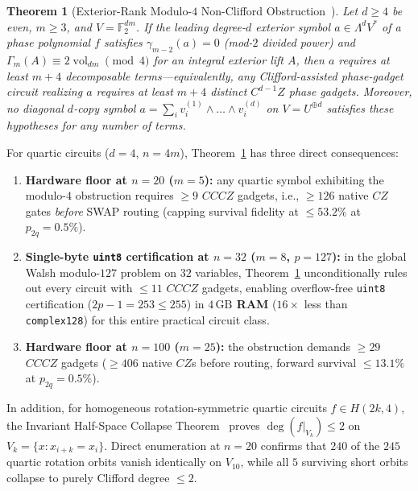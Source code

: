 \documentclass[11pt,a4paper]{article}
\newtheorem{theorem}{Theorem}
\newcommand{\F}{\mathbb{F}}
\begin{document}
\begin{theorem}[Exterior-Rank Modulo-$4$ Non-Clifford Obstruction~\cite{Vono2026Exterior}]
\label{thm:exterior}
Let $d \ge 4$ be even, $m \ge 3$, and $V = \F_2^{dm}$. If the leading degree-$d$ exterior symbol $a \in \Lambda^d V^*$ of a phase polynomial $f$ satisfies $\gamma_{m-2}(a) = 0$ (mod-$2$ divided power) and $\Gamma_m(A) \equiv 2\operatorname{vol}_{dm} \pmod 4$ for an integral exterior lift $A$, then $a$ requires at least $m + 4$ decomposable terms---equivalently, any Clifford-assisted phase-gadget circuit realizing $a$ requires at least $m + 4$ distinct $C^{d-1}Z$ phase gadgets. Moreover, no diagonal $d$-copy symbol $a = \sum_i v_i^{(1)}\wedge\dots\wedge v_i^{(d)}$ on $V = U^{\oplus d}$ satisfies these hypotheses for any number of terms.
\end{theorem}

For quartic circuits ($d=4$, $n=4m$), Theorem~\ref{thm:exterior} has three direct consequences:
\begin{enumerate}
  \item \textbf{Hardware floor at $n = 20$ ($m = 5$):} any quartic symbol exhibiting the modulo-$4$ obstruction requires $\ge 9$ $CCCZ$ gadgets, i.e., $\ge 126$ native $CZ$ gates \emph{before} SWAP routing (capping survival fidelity at $\le 53.2\%$ at $p_{2q}=0.5\%$).
  \item \textbf{Single-byte \texttt{uint8} certification at $n = 32$ ($m = 8$, $p = 127$):} in the global Walsh modulo-$127$ problem on $32$ variables, Theorem~\ref{thm:exterior} unconditionally rules out every circuit with $\le 11$ $CCCZ$ gadgets, enabling overflow-free \texttt{uint8} certification ($2p - 1 = 253 \le 255$) in \textbf{$4\,\text{GB}$ RAM} ($16\times$ less than \texttt{complex128}) for this entire practical circuit class.
  \item \textbf{Hardware floor at $n = 100$ ($m = 25$):} the obstruction demands $\ge 29$ $CCCZ$ gadgets ($\ge 406$ native $CZ$s before routing, forward survival $\le 13.1\%$ at $p_{2q}=0.5\%$).
\end{enumerate}

In addition, for homogeneous rotation-symmetric quartic circuits $f \in H(2k, 4)$, the Invariant Half-Space Collapse Theorem~\cite{Vono2026H12} proves $\deg(f|_{V_k}) \le 2$ on $V_k = \{x : x_{i+k}=x_i\}$. Direct enumeration at $n = 20$ confirms that $240$ of the $245$ quartic rotation orbits vanish identically on $V_{10}$, while all $5$ surviving short orbits collapse to purely Clifford degree $\le 2$.
\end{document}
